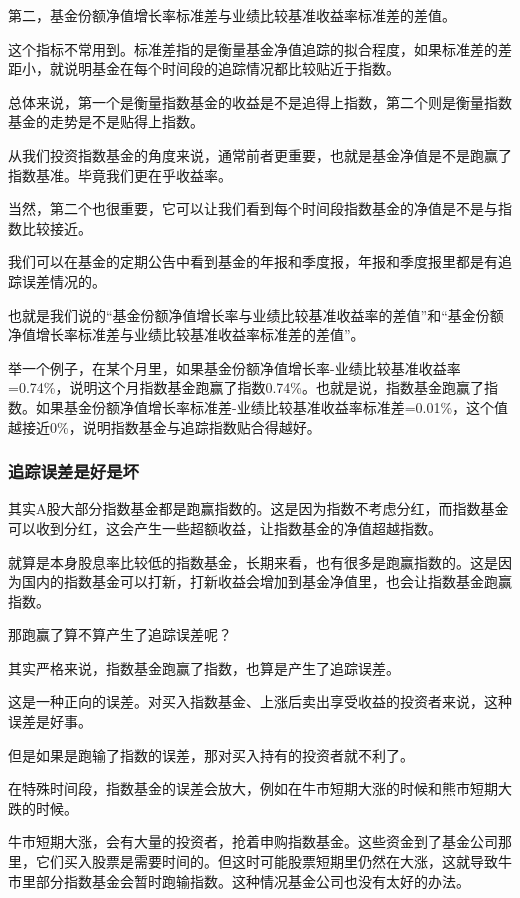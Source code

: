 第二，基金份额净值增长率标准差与业绩比较基准收益率标准差的差值。

这个指标不常用到。标准差指的是衡量基金净值追踪的拟合程度，如果标准差的差距小，就说明基金在每个时间段的追踪情况都比较贴近于指数。

总体来说，第一个是衡量指数基金的收益是不是追得上指数，第二个则是衡量指数基金的走势是不是贴得上指数。

从我们投资指数基金的角度来说，通常前者更重要，也就是基金净值是不是跑赢了指数基准。毕竟我们更在乎收益率。

当然，第二个也很重要，它可以让我们看到每个时间段指数基金的净值是不是与指数比较接近。

我们可以在基金的定期公告中看到基金的年报和季度报，年报和季度报里都是有追踪误差情况的。

也就是我们说的“基金份额净值增长率与业绩比较基准收益率的差值”和“基金份额净值增长率标准差与业绩比较基准收益率标准差的差值”。

举一个例子，在某个月里，如果基金份额净值增长率-业绩比较基准收益率=0.74\%，说明这个月指数基金跑赢了指数0.74\%。也就是说，指数基金跑赢了指数。如果基金份额净值增长率标准差-业绩比较基准收益率标准差=0.01\%，这个值越接近0\%，说明指数基金与追踪指数贴合得越好。

\subsubsection{追踪误差是好是坏}

其实A股大部分指数基金都是跑赢指数的。这是因为指数不考虑分红，而指数基金可以收到分红，这会产生一些超额收益，让指数基金的净值超越指数。

就算是本身股息率比较低的指数基金，长期来看，也有很多是跑赢指数的。这是因为国内的指数基金可以打新，打新收益会增加到基金净值里，也会让指数基金跑赢指数。

那跑赢了算不算产生了追踪误差呢？

其实严格来说，指数基金跑赢了指数，也算是产生了追踪误差。

这是一种正向的误差。对买入指数基金、上涨后卖出享受收益的投资者来说，这种误差是好事。

但是如果是跑输了指数的误差，那对买入持有的投资者就不利了。

在特殊时间段，指数基金的误差会放大，例如在牛市短期大涨的时候和熊市短期大跌的时候。

牛市短期大涨，会有大量的投资者，抢着申购指数基金。这些资金到了基金公司那里，它们买入股票是需要时间的。但这时可能股票短期里仍然在大涨，这就导致牛市里部分指数基金会暂时跑输指数。这种情况基金公司也没有太好的办法。

